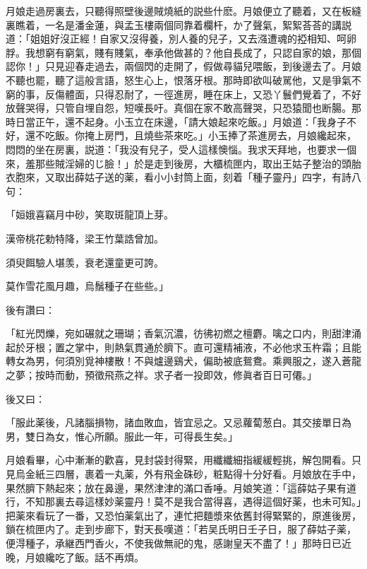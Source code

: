 月娘走過房裏去，只聽得照壁後邊賊燒紙的説些什麽。月娘便立了聽着，又在板縫裏瞧着，一名是潘金蓮，與孟玉樓兩個同靠着欄杆，か了聲氣，絮絮荅荅的講説道：「姐姐好沒正經！自家又沒得養，別人養的兒子，又去漒遭魂的掗相知、呵卵脬。我想窮有窮氣，賤有賤氣，奉承他做甚的？他自長成了，只認自家的娘，那個認你！」只見迎春走過去，兩個閃的走開了，假做尋貓兒喂飯，到後邊去了。月娘不聽也罷，聽了這般言語，怒生心上，恨落牙根。那時即欲叫破駡他，又是爭氣不窮的事，反傷體面，只得忍耐了，一徑進房，睡在床上，又恐丫鬟們覺着了，不好放聲哭得，只管自埋自怨，短嘆長吁。真個在家不敢高聲哭，只恐猿聞也断腸。那時日當正午，還不起身。小玉立在床邊，「請大娘起來吃飯。」月娘道：「我身子不好，還不吃飯。你掩上房門，且燒些茶來吃。」小玉捧了茶進房去，月娘纔起來，悶悶的坐在房裏，説道：「我没有兒子，受人這樣懊惱。我求天拜地，也要求一個來，羞那些賊淫婦的じ臉！」於是走到後房，大櫃梳匣内，取出王姑子整治的頭胎衣胞來，又取出薛姑子送的薬，看小小封筒上面，刻着「種子靈丹」四字，有詩八句：

\begin{myquote}
「姮娥喜竊月中砂，笑取斑龍頂上芽。

漢帝桃花勅特降，梁王竹葉誥曾加。

須臾餌驗人堪羡，衰老還童更可誇。

莫作雪花風月趣，烏鬚種子在些些。」
\end{myquote}

後有讚曰：

\begin{myquote}
「紅光閃爍，宛如碾就之珊瑚；香氣沉濃，彷彿初燃之檀麝。噙之口内，則甜津涌起於牙根；置之掌中，則熱氣貫通於臍下。直可還精補液，不必他求玉杵霜；且能轉女為男，何須別覓神樓散！不與爐邊鷄犬，偏助被底鴛鴦。乘興服之，遂入蒼龍之夢；按時而動，預徵飛燕之祥。求子者一投即效，修眞者百日可僊。」
\end{myquote}

後又曰：

\begin{myquote}
「服此薬後，凡諸腦損物，諸血敗血，皆宜忌之。又忌蘿蔔葱白。其交接單日為男，雙日為女，惟心所願。服此一年，可得長生矣。」
\end{myquote}

月娘看畢，心中漸漸的歡喜，見封袋封得緊，用纖纖細指緩緩輕挑，解包開看。只見烏金紙三四層，裹着一丸薬，外有飛金硃砂，粧點得十分好看。月娘放在手中，果然臍下熱起來；放在鼻邊，果然津津的滿口香唾。月娘笑道：「這薛姑子果有道行，不知那裏去尋這樣妙薬靈丹！莫不是我合當得喜，遇得這個好薬，也未可知。」把薬來看玩了一番，又恐怕薬氣出了，連忙把麵漿來依舊封得緊緊的，原進後房，鎖在梳匣内了。走到步廊下，對天長嘆道：「若吴氏明日壬子日，服了薛姑子薬，便淂種子，承継西門香火，不使我做無祀的鬼，感謝皇天不盡了！」那時日已近晚，月娘纔吃了飯。話不再煩。

